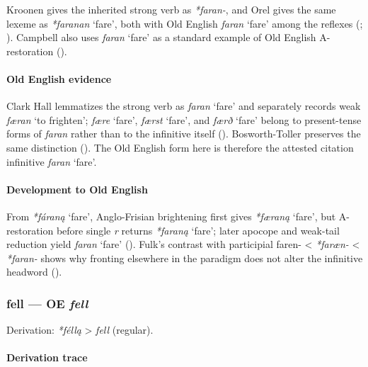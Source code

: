 \documentclass[
  british,
  a4paper,
]{article}
\providecommand{\Recon}[1]{\emph{*#1}}
\begin{document}
Kroonen gives the inherited strong verb as \emph{*faran-}, and Orel
gives the same lexeme as \Recon{faranan} `fare', both with Old English
\emph{faran} `fare' among the reflexes
(; ). Campbell also uses \emph{faran} `fare' as a standard
example of Old English A-restoration
().

\paragraph{Old English evidence}\label{old-english-evidence-17}

Clark Hall lemmatizes the strong verb as \emph{faran} `fare' and
separately records weak \emph{færan} `to frighten'; {\emph{fære}}
`fare', {\emph{færst}} `fare', and {\emph{færð}} `fare' belong to
present-tense forms of \emph{faran} rather than to the infinitive itself
(). Bosworth-Toller
preserves the same distinction
(). The
Old English form here is therefore the attested citation infinitive
\emph{faran} `fare'.

\paragraph{Development to Old
English}\label{development-to-old-english-17}

From \Recon{fáraną} `fare', Anglo-Frisian brightening first gives
\Recon{færaną} `fare', but A-restoration before single \emph{r} returns
\Recon{faraną} `fare'; later apocope and weak-tail reduction yield
\emph{faran} `fare' ().
Fulk's contrast with participial faren- \textless{} \emph{*faræn-}
\textless{} \emph{*faran-} shows why fronting elsewhere in the paradigm
does not alter the infinitive headword ().

\subsubsection{\texorpdfstring{fell --- OE
\emph{fell}}{fell --- OE fell}}\label{fell-oe-fell}

Derivation: \emph{*féllą} \textgreater{} \emph{fell} (regular).

\paragraph{Derivation trace}\label{derivation-trace-21}
\end{document}
